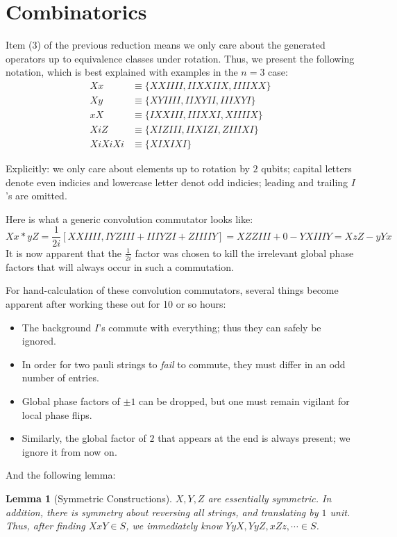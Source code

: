 \documentclass[fleqn,12pt]{article}
\newtheorem{lemma}{Lemma}
\begin{document}
\section{Combinatorics}

Item (3) of the previous reduction means we only care about
the generated operators up to equivalence classes under rotation. Thus, we present
the following notation, which is best explained with examples in the $n = 3$
case:
\begin{align*}
    Xx     & \equiv \{ XXIIII, IIXXIIX, IIIIXX \} \\
    Xy     & \equiv \{ XYIIII, IIXYII, IIIXYI \}  \\
    xX     & \equiv \{ IXXIII, IIIXXI, XIIIIX \}  \\
    XiZ    & \equiv \{ XIZIII, IIXIZI, ZIIIXI \}  \\
    XiXiXi & \equiv \{ XIXIXI\}
\end{align*}

Explicitly: we only care about elements up to rotation by $2$ qubits;
capital letters denote even indicies and lowercase letter denot odd indicies;
leading and trailing $I$'s are omitted.

Here is what a generic convolution commutator looks like:
\[
    Xx * yZ = \frac{1}{2i}[XXIIII, IYZIII + IIIYZI + ZIIIIY] = XZZIII + 0 - YXIIIY = XzZ - yYx
\]
It is now apparent that the $\frac1{2i}$ factor was chosen to kill the
irrelevant global phase factors that will always occur in such a commutation.

For hand-calculation of these convolution commutators, several things become
apparent after working these out for 10 or so hours:
\begin{itemize}
    \item The background $I$'s commute with everything;
          thus they can safely be ignored.
    \item In order for two pauli strings to \emph{fail} to commute,
          they must differ in an odd number of entries.
    \item Global phase factors of $\pm 1$ can be dropped, but one must
          remain vigilant for local phase flips.
    \item Similarly, the global factor of $2$ that appears at the end is always
          present; we ignore it from now on.
\end{itemize}
And the following lemma:
\begin{lemma}
    [Symmetric Constructions]
    $X, Y, Z$ are essentially symmetric. In addition, there is
    symmetry about reversing all strings, and translating by $1$ unit.
    Thus, after finding $XxY\in S$, we immediately know
    $YyX, YyZ, xZz, \cdots \in S$.
\end{lemma}
\end{document}
